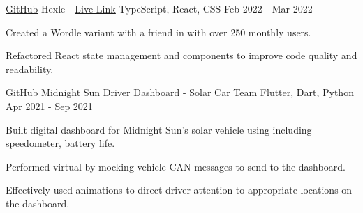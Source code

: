 

\begin{cventries}

  \cventry
    {\href{https://github.com/frankljin/hexle/}{\underline{GitHub}}} %
    {Hexle - \href{https://frankljin.github.io/hexle/}{\underline{Live Link}}} %
    {TypeScript, React, CSS} %
    {Feb 2022 - Mar 2022} %
    {
      \begin{cvitems} %
        \item {Created a Wordle variant with a friend in  with over 250 monthly users.}
        \item {Refactored React state management and components to improve code quality and readability.}
      \end{cvitems}
    }

  \cventry
    {\href{https://github.com/uw-midsun/telemetry_xiv}{\underline{GitHub}}} %
    {Midnight Sun Driver Dashboard - Solar Car Team} %
    {Flutter, Dart, Python} %
    {Apr 2021 - Sep 2021} %
    {
      \begin{cvitems} %
        \item {Built digital dashboard for Midnight Sun's solar vehicle using  including speedometer, battery life.}
        \item {Performed virtual  by mocking vehicle CAN messages to send to the dashboard.}
        \item {Effectively used animations to direct driver attention to appropriate locations on the dashboard.}
      \end{cvitems}
    }



\end{cventries}
